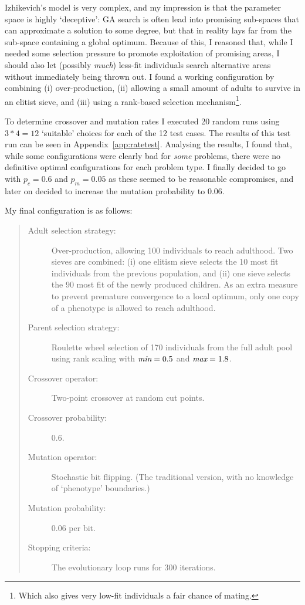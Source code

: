 \documentclass[a4paper,9pt]{article}
\begin{document}
Izhikevich's model is very complex, and my impression is that the
parameter space is highly `deceptive': GA search is often lead into promising
sub-spaces that can approximate a solution to some degree, but that in reality
lays far from the sub-space containing a global optimum. Because of this, I
reasoned that, while I needed some selection pressure to promote exploitation
of promising areas, I should also let (possibly \emph{much}) less-fit
individuals search alternative areas without immediately being
thrown out. I found a working configuration by combining (i) over-production,
(ii) allowing a small amount of adults to survive in an elitist sieve, and
(iii) using a rank-based selection mechanism\footnote{Which also gives very
low-fit individuals a fair chance of mating.}.

To determine crossover and mutation rates I executed 20
random runs using $3*4=12$ `suitable' choices for each of the 12 test cases.
The results of this test run can be seen in Appendix~\ref{app:ratetest}.
Analysing the results, I found that, while some configurations were clearly
bad for \emph{some} problems, there were no definitive optimal configurations
for each problem type. I finally decided to go with $p_c = 0.6$ and $p_m =
0.05$ as these seemed to be reasonable compromises, and later on decided to
increase the mutation probability to $0.06$. 

My final configuration is as follows:

\begin{quote}
{\footnotesize
\vspace{-3pt}
\begin{description}
  \item[Adult selection strategy:] 
      Over-production, allowing 100 individuals
      to reach adulthood. Two sieves are combined: (i) one elitism sieve
      selects the 10 most fit individuals from the previous population, and
      (ii) one sieve selects the 90 most fit of the newly produced children.
      As an extra measure to prevent premature convergence to a local optimum,
      only one copy of a phenotype is allowed to reach adulthood.
  \item[Parent selection strategy:] 
      Roulette wheel selection of 170
      individuals from the full adult pool using rank scaling with $\emph{min}
      = 0.5$ and $\emph{max} = 1.8$.
  \item[Crossover operator:] Two-point crossover at random cut points. 
  \item[Crossover probability:] $0.6$.
  \item[Mutation operator:] Stochastic bit flipping. (The traditional version,
      with no knowledge of `phenotype' boundaries.) 
  \item[Mutation probability:] $0.06$ per bit.
  \item[Stopping criteria:] The evolutionary loop runs for 300 iterations.
\end{description}
}
\end{quote}
\end{document}
